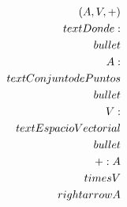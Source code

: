 \documentclass[preview]{standalone}
\begin{document}
\begin{align*}
\special{dvisvgm:raw <g id='unique000'>}(A, V, +) \special{dvisvgm:raw </g>}\special{dvisvgm:raw <g id='unique001'>}\\text{Donde:} \special{dvisvgm:raw </g>}\special{dvisvgm:raw <g id='unique002'>}\\bullet \\ A: \\text{Conjunto de Puntos} \special{dvisvgm:raw </g>}\special{dvisvgm:raw <g id='unique003'>}\\bullet \\ V: \\text{Espacio Vectorial} \special{dvisvgm:raw </g>}\special{dvisvgm:raw <g id='unique004'>}\\bullet \\ + : A \\times V \\rightarrow A\special{dvisvgm:raw </g>}
\end{align*}
\end{document}
